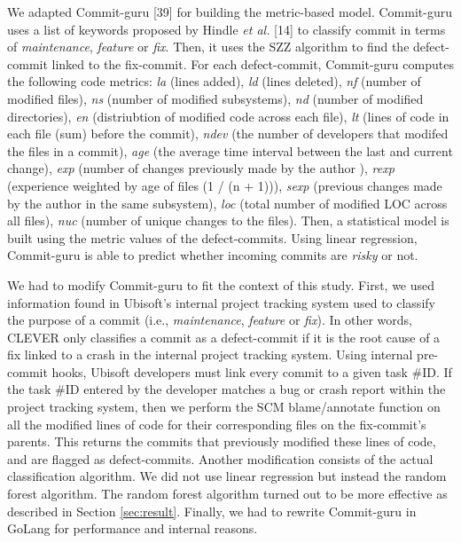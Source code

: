 \documentclass[sigconf]{acmart}
\begin{document}
We adapted Commit-guru {[}39{]} for building the metric-based model.
Commit-guru uses a list of keywords proposed by Hindle \emph{et al.}
{[}14{]} to classify commit in terms of \emph{maintenance},
\emph{feature} or \emph{fix}. Then, it uses the SZZ algorithm to find
the defect-commit linked to the fix-commit. For each defect-commit,
Commit-guru computes the following code metrics: \emph{la} (lines
added), \emph{ld} (lines deleted), \emph{nf} (number of modified files),
\emph{ns} (number of modified subsystems), \emph{nd} (number of modified
directories), \emph{en} (distriubtion of modified code across each
file), \emph{lt} (lines of code in each file (sum) before the commit),
\emph{ndev} (the number of developers that modifed the files in a
commit), \emph{age} (the average time interval between the last and
current change), \emph{exp} (number of changes previously made by the
author ), \emph{rexp} (experience weighted by age of files (1 / (n +
1))), \emph{sexp} (previous changes made by the author in the same
subsystem), \emph{loc} (total number of modified LOC across all files),
\emph{nuc} (number of unique changes to the files). Then, a statistical
model is built using the metric values of the defect-commits. Using
linear regression, Commit-guru is able to predict whether incoming
commits are \emph{risky} or not.

We had to modify Commit-guru to fit the context of this study. First, we
used information found in Ubisoft's internal project tracking system
used to classify the purpose of a commit (i.e., \emph{maintenance},
\emph{feature} or \emph{fix}). In other words, CLEVER only classifies a
commit as a defect-commit if it is the root cause of a fix linked to a
crash in the internal project tracking system. Using internal pre-commit
hooks, Ubisoft developers must link every commit to a given task \#ID.
If the task \#ID entered by the developer matches a bug or crash report
within the project tracking system, then we perform the SCM
blame/annotate function on all the modified lines of code for their
corresponding files on the fix-commit's parents. This returns the
commits that previously modified these lines of code, and are flagged as
defect-commits. Another modification consists of the actual
classification algorithm. We did not use linear regression but instead
the random forest algorithm. The random forest algorithm turned out to
be more effective as described in Section \ref{sec:result}. Finally, we
had to rewrite Commit-guru in GoLang for performance and internal
reasons.
\end{document}
